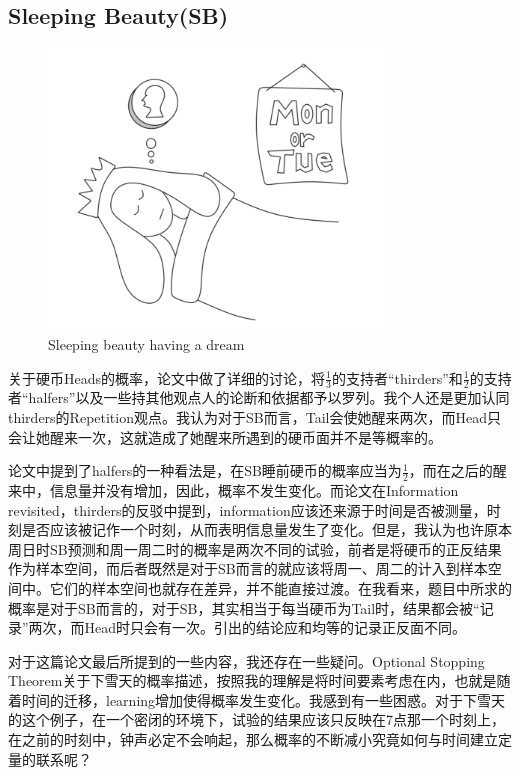 \documentclass[12pt, a4paper]{article}
\begin{document}
\subsection{Sleeping Beauty(SB)}
\begin{figure}[htbp]
    \centering
    \includegraphics[width=3.5in]{../resource/SB.png}
    \caption{Sleeping beauty having a dream}
\end{figure}
关于硬币Heads的概率，论文中做了详细的讨论，将$\frac{1}{3}$的支持者“thirders”和$\frac{1}{2}$的支持者“halfers”以及一些持其他观点人的论断和依据都予以罗列。我个人还是更加认同thirders的Repetition观点。我认为对于SB而言，Tail会使她醒来两次，而Head只会让她醒来一次，这就造成了她醒来所遇到的硬币面并不是等概率的。\par
论文中提到了halfers的一种看法是，在SB睡前硬币的概率应当为$\frac{1}{2}$，而在之后的醒来中，信息量并没有增加，因此，概率不发生变化。而论文在Information revisited，thirders的反驳中提到，information应该还来源于时间是否被测量，时刻是否应该被记作一个时刻，从而表明信息量发生了变化。但是，我认为也许原本周日时SB预测和周一周二时的概率是两次不同的试验，前者是将硬币的正反结果作为样本空间，而后者既然是对于SB而言的就应该将周一、周二的计入到样本空间中。它们的样本空间也就存在差异，并不能直接过渡。在我看来，题目中所求的概率是对于SB而言的，对于SB，其实相当于每当硬币为Tail时，结果都会被“记录”两次，而Head时只会有一次。引出的结论应和均等的记录正反面不同。\par
对于这篇论文最后所提到的一些内容，我还存在一些疑问。Optional Stopping Theorem关于下雪天的概率描述，按照我的理解是将时间要素考虑在内，也就是随着时间的迁移，learning增加使得概率发生变化。我感到有一些困惑。对于下雪天的这个例子，在一个密闭的环境下，试验的结果应该只反映在7点那一个时刻上，在之前的时刻中，钟声必定不会响起，那么概率的不断减小究竟如何与时间建立定量的联系呢？


\end{document}
